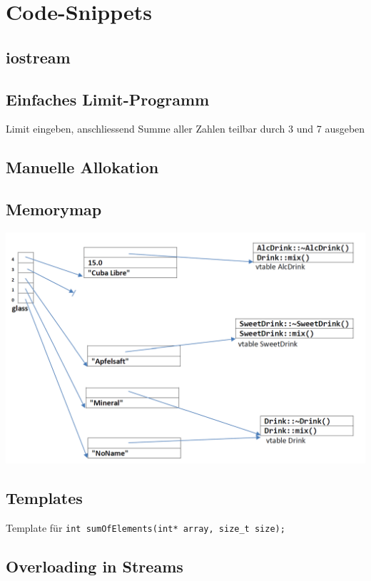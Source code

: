 \section{Code-Snippets}

\subsection{iostream}
    

\subsection{Einfaches Limit-Programm}
    Limit eingeben, anschliessend Summe aller Zahlen teilbar durch 3 und 7 ausgeben
    

\subsection{Manuelle Allokation}\label{Manuelle Allokation}
    



\subsection{Memorymap}
    
    \nextcol
    
    

    \begin{center}
        \includegraphics[width=\columnwidth]{pictures/memorymap-drink.png}  
    \end{center}
    \nextcol

\subsection{Templates}\label{Templates}
    Template für \verb|int sumOfElements(int* array, size_t size);|
    

\subsection{Overloading in Streams}
    

    \nextcol